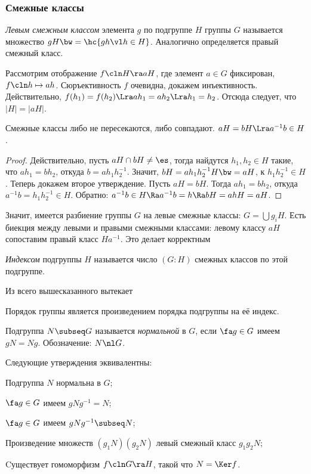 \documentclass[a4paper]{article}
\begin{document}
\subsubsection{Смежные классы}

\begin{df}
\emph{Левым смежным классом} элемента $g$ по подгруппе $H$ группы $G$ называется множество  $gH \bw= \hc{gh
\vl h \in H}$. Аналогично определяется правый смежный класс.
\end{df}

Рассмотрим отображение $f\cln H \ra aH$, где элемент $a \in G$ фиксирован, $f\cln h \mapsto ah$.
Сюръективность $f$ очевидна, докажем инъективность. Действительно, $f(h_1) = f(h_2) \Lra a h_1 = a h_2 \Lra
h_1 = h_2$. Отсюда следует, что $|H| = |aH|$.

\begin{stm}
Смежные классы либо не пересекаются, либо совпадают. $aH=bH \Lra a^{-1}b\in H$.
\end{stm}
\begin{proof}
Действительно, пусть $aH \cap bH \neq \es$, тогда найдутся $h_1, h_2 \in H$ такие, что $ah_1 = bh_2$,
откуда $b=ah_1h_2^{-1}$. Значит, $bH = ah_1 h_2^{-1}H \bw= aH$, к $h_1h_2^{-1} \in H$.
Теперь докажем второе утверждение. Пусть $aH=bH$. Тогда $ah_1=bh_2$, откуда $a^{-1}b=h_1h_2^{-1} \in H$.
Обратно: $a^{-1}b \in H \Ra a^{-1}b=h \Ra bH = ahH = aH$.
\end{proof}

Значит, имеется разбиение группы $G$ на левые смежные классы: $G = \bigcup g_iH$. Есть биекция между левыми и
правыми смежными классами: левому классу $aH$ сопоставим правый класс  $Ha^{-1}$. Это делает корректным

\begin{df}
\emph{Индексом} подгруппы $H$ называется число $(G:H)$ смежных классов по этой подгруппе.
\end{df}

Из всего вышесказанного вытекает
\begin{theorem}[Лагранжа]
Порядок группы является произведением порядка подгруппы на её индекс.
\end{theorem}

\begin{df}
Подгруппа $N \subseq G$ называется \emph{нормальной} в $G$, если $\fa g \in G$ имеем $gN = Ng$.
Обозначение: $N \nl G$.
\end{df}

\begin{stm}
Следующие утверждения эквивалентны:

 Подгруппа $N$ нормальна в $G$;

 $\fa g \in G$ имеем $gNg^{-1} = N$;

 $\fa g \in G$ имеем $gNg^{-1} \subseq N$;

 Произведение множеств $(g_1 N)(g_2 N)$ левый смежный класс $g_1 g_2 N$;

 Cуществует гомоморфизм $f\cln G \ra H$, такой что $N = \Ker f$.
\end{stm}
\end{document}
